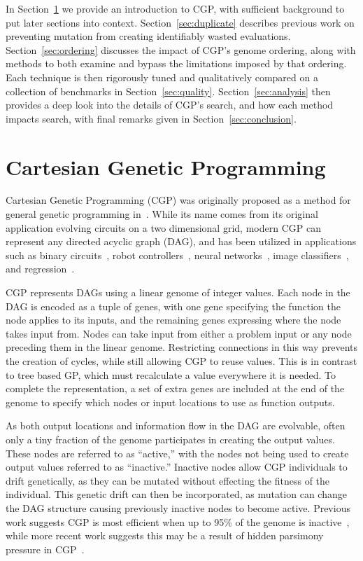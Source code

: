 \documentclass[journal]{IEEEtran}
\begin{document}
In Section~\ref{sec:cgp} we provide
an introduction to CGP, with sufficient background to put later sections into
context.  Section~\ref{sec:duplicate} describes previous work on preventing mutation
from creating identifiably wasted evaluations.
Section~\ref{sec:ordering} discusses the impact of CGP's genome ordering,
along with methods to both examine and bypass the limitations imposed by that ordering.
Each technique is then rigorously tuned and qualitatively compared on a collection
of benchmarks in Section~\ref{sec:quality}.  Section~\ref{sec:analysis} then
provides a deep look into the details of CGP's search, and how each method impacts
search, with final remarks given in Section~\ref{sec:conclusion}.


\section{Cartesian Genetic Programming}
\label{sec:cgp}
Cartesian Genetic Programming (CGP) was originally proposed as a method for general
genetic programming in~\cite{miller:2000:CGPorigin}.  While its name comes from
its original application evolving circuits on a two dimensional grid, modern CGP can
represent any directed acyclic graph (DAG), and has been utilized in applications such as binary
circuits~\cite{walker:2008:cgpmodules},
robot controllers~\cite{harding:2005:robots},
neural networks~\cite{khan:2010:cgpann},
image classifiers~\cite{harding:2012:mtcgp},
and regression~\cite{harding:2009:smcgp}.

CGP represents DAGs using a linear genome of integer values.  Each node in the
DAG is encoded as a tuple of genes, with one gene specifying the function
the node applies to its inputs, and the remaining genes expressing where the
node takes input from.  Nodes can take input from either a problem input or
any node preceding them in the linear genome.  Restricting connections in this way
prevents the creation of cycles, while still allowing CGP to reuse values.  This is
in contrast to tree based GP, which must recalculate a value everywhere it is needed.
To complete the representation, a set
of extra genes are included at the end of the genome to specify which nodes or
input locations to use as function outputs.

As both output locations and information flow in the DAG are evolvable, often
only a tiny fraction of the genome participates in creating the
output values.  These nodes are referred to as ``active,'' with the nodes not
being used to create output values referred to as ``inactive.''  Inactive nodes
allow CGP individuals to drift genetically, as they can be mutated without effecting
the fitness of the individual.  This genetic drift can then be incorporated, as
mutation can change the DAG structure causing previously inactive nodes to become
active.  Previous work suggests CGP is most efficient when up to 95\% of the genome
is inactive~\cite{miller:2006:redundancy}, while more recent work suggests this may
be a result of hidden parsimony pressure in CGP~\cite{goldman:2013:ordering}.
\end{document}

